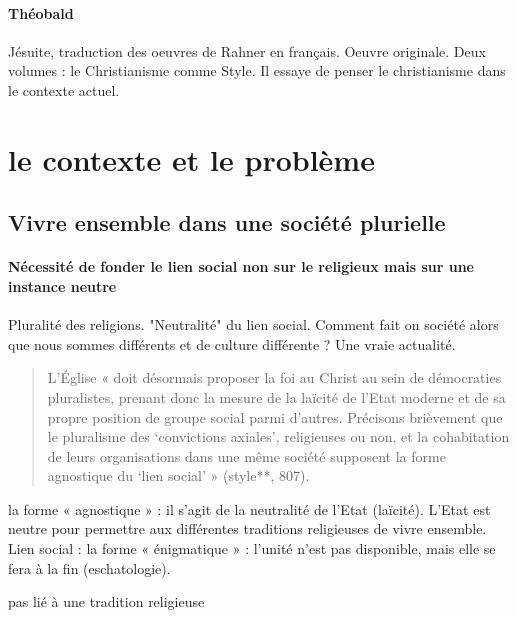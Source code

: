 \paragraph{Théobald} Jésuite, traduction des oeuvres de Rahner en français. Oeuvre originale. Deux volumes : le Christianisme comme Style. Il essaye de penser le christianisme dans le contexte actuel.


\section{le contexte et le problème}


\subsection{Vivre ensemble dans une société plurielle}

\paragraph{Nécessité de fonder le lien social non sur le religieux mais sur une instance neutre} Pluralité des religions. "Neutralité" du lien social. Comment fait on société alors que nous sommes différents et de culture différente ? Une vraie actualité. 
\begin{quote}
    L’Église « doit désormais proposer la foi au Christ au sein de démocraties pluralistes, prenant donc la mesure de la laïcité de l’Etat moderne et de sa propre position de groupe social parmi d’autres. Précisons brièvement que le pluralisme des ‘convictions axiales’, religieuses ou non, et la cohabitation de leurs organisations dans une même société supposent la forme agnostique du  ‘lien social’ » (style**, 807).
\end{quote}
\begin{Def}
la forme « agnostique » : il s’agit de la neutralité de l’Etat (laïcité). L’Etat est
neutre pour permettre aux différentes traditions religieuses de vivre ensemble.
Lien social : la forme « énigmatique » : l’unité n’est pas disponible, mais elle se fera à la fin
(eschatologie).
\end{Def}
 
\begin{Def}
  pas lié à une tradition religieuse  
\end{Def}

